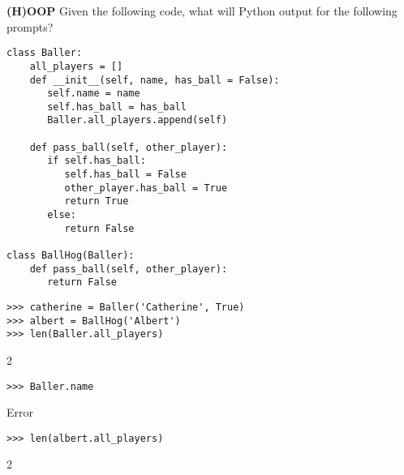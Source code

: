 \begin{blocksection}
\question \textbf{(H)OOP} \newline
Given the following code, what will Python output for the following prompts?

\begin{lstlisting}
class Baller:
    all_players = []
    def __init__(self, name, has_ball = False):
       self.name = name
       self.has_ball = has_ball
       Baller.all_players.append(self)

    def pass_ball(self, other_player):
       if self.has_ball:
          self.has_ball = False
          other_player.has_ball = True
          return True
       else:
          return False

class BallHog(Baller):
    def pass_ball(self, other_player):
       return False

\end{lstlisting}
\end{blocksection}
\begin{blocksection}

\begin{lstlisting}
>>> catherine = Baller('Catherine', True)
>>> albert = BallHog('Albert')
>>> len(Baller.all_players)
\end{lstlisting}
\begin{solution}[.2in]
2
\end{solution}

\begin{lstlisting}
>>> Baller.name
\end{lstlisting}
\begin{solution}[.2in]
Error
\end{solution}

\begin{lstlisting}
>>> len(albert.all_players)
\end{lstlisting}
\begin{solution}[.2in]
2
\end{solution}
\end{blocksection}


